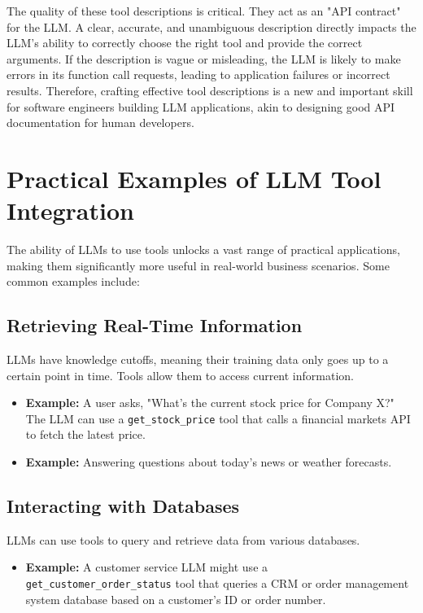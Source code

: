 The quality of these tool descriptions is critical. They act as an "API contract" for the LLM. A clear, accurate, and unambiguous description directly impacts 
the LLM's ability to correctly choose the right tool and provide the correct arguments. If the description is vague or misleading, the LLM is likely to make 
errors in its function call requests, leading to application failures or incorrect results. Therefore, crafting effective tool descriptions is a new and important 
skill for software engineers building LLM applications, akin to designing good API documentation for human developers.

\section{Practical Examples of LLM Tool Integration}

The ability of LLMs to use tools unlocks a vast range of practical applications, making them significantly more useful in real-world business scenarios. Some 
common examples include:

\subsection*{Retrieving Real-Time Information}
LLMs have knowledge cutoffs, meaning their training data only goes up to a certain point in time. Tools allow them to access current information.
\begin{itemize}
    \item \textbf{Example:} A user asks, "What's the current stock price for Company X?" The LLM can use a \texttt{get\_stock\_price} tool that calls a financial
     markets API to fetch the latest price.
    \item \textbf{Example:} Answering questions about today's news or weather forecasts.
\end{itemize}

\subsection*{Interacting with Databases}
LLMs can use tools to query and retrieve data from various databases.
\begin{itemize}
    \item \textbf{Example:} A customer service LLM might use a \texttt{get\_customer\_order\_status} tool that queries a CRM or order management system database 
    based on a customer's ID or order number.
\end{itemize}


